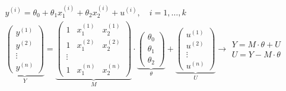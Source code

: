 \begin{enumerate}[label=\color{red}\arabic*),leftmargin=*]
\begin{enumerate}[label=\color{red}\alph*)]
	$\begin{array}{l}
		y^{(i)}=\theta_0+\theta_1x_1^{(i)}+\theta_2x_2^{(i)}+u^{(i)},\quad i=1,\dots,k\\
		\underbrace{\begin{pmatrix}
				y^{(1)}\\
				y^{(2)}\\
				\vdots\\
				y^{(n)}
		\end{pmatrix}}_Y=\underbrace{\begin{pmatrix}
		1 & x_1^{(1)} & x_2^{(1)}\\
		1 & x_1^{(2)} & x_2^{(2)}\\
		\vdots & & \\
		1 & x_1^{(n)} & x_2^{(n)}
	\end{pmatrix}}_M\cdot\underbrace{\begin{pmatrix}
	\theta_0\\
	\theta_1\\
	\theta_2
\end{pmatrix}}_\theta+\underbrace{\begin{pmatrix}
u^{(1)}\\
u^{(2)}\\
\vdots\\
u^{(n)}
\end{pmatrix}}_U\longrightarrow\begin{array}{l}
Y=M\cdot\theta+U\\
U=Y-M\cdot\theta
\end{array}\\
	\end{array}$
	

\end{enumerate}
\end{enumerate}
